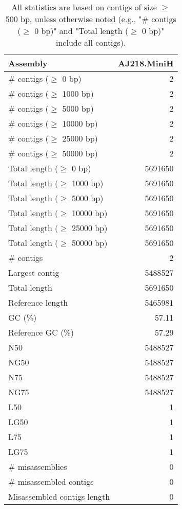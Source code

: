 \documentclass[12pt,a4paper]{article}
\begin{document}
\begin{table}[ht]
\begin{center}
\caption{All statistics are based on contigs of size $\geq$ 500 bp, unless otherwise noted (e.g., "\# contigs ($\geq$ 0 bp)" and "Total length ($\geq$ 0 bp)" include all contigs).}
\begin{tabular}{|l*{1}{|r}|}
\hline
Assembly & AJ218.MiniH \\ \hline
\# contigs ($\geq$ 0 bp) & 2 \\ \hline
\# contigs ($\geq$ 1000 bp) & 2 \\ \hline
\# contigs ($\geq$ 5000 bp) & 2 \\ \hline
\# contigs ($\geq$ 10000 bp) & 2 \\ \hline
\# contigs ($\geq$ 25000 bp) & 2 \\ \hline
\# contigs ($\geq$ 50000 bp) & 2 \\ \hline
Total length ($\geq$ 0 bp) & 5691650 \\ \hline
Total length ($\geq$ 1000 bp) & 5691650 \\ \hline
Total length ($\geq$ 5000 bp) & 5691650 \\ \hline
Total length ($\geq$ 10000 bp) & 5691650 \\ \hline
Total length ($\geq$ 25000 bp) & 5691650 \\ \hline
Total length ($\geq$ 50000 bp) & 5691650 \\ \hline
\# contigs & 2 \\ \hline
Largest contig & 5488527 \\ \hline
Total length & 5691650 \\ \hline
Reference length & 5465981 \\ \hline
GC (\%) & 57.11 \\ \hline
Reference GC (\%) & 57.29 \\ \hline
N50 & 5488527 \\ \hline
NG50 & 5488527 \\ \hline
N75 & 5488527 \\ \hline
NG75 & 5488527 \\ \hline
L50 & 1 \\ \hline
LG50 & 1 \\ \hline
L75 & 1 \\ \hline
LG75 & 1 \\ \hline
\# misassemblies & 0 \\ \hline
\# misassembled contigs & 0 \\ \hline
Misassembled contigs length & 0 \\ \hline

\end{tabular}
\end{center}
\end{table}
\end{document}
